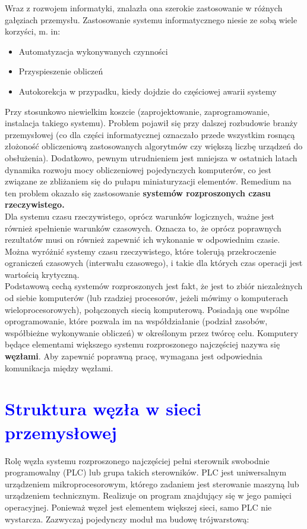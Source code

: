 \documentclass[a4paper,twoside]{article}
\begin{document}
Wraz z rozwojem informatyki, znalazła ona szerokie zastosowanie w różnych gałęziach przemysłu.  Zastosowanie systemu informatycznego niesie ze sobą wiele korzyści, m. in: \\
\begin{itemize}
	\item Automatyzacja wykonywanych czynności \\
	\item Przyspieszenie obliczeń \\
	\item Autokorekcja w przypadku, kiedy dojdzie do częściowej awarii systemy \\
\end{itemize}

Przy stosunkowo niewielkim koszcie (zaprojektowanie, zaprogramowanie, instalacja takiego systemu).  Problem pojawił się przy dalszej rozbudowie branży przemysłowej (co dla części informatycznej oznaczało przede wszystkim rosnącą złożoność obliczeniową zastosowanych algorytmów czy większą liczbę urządzeń do obsłużenia). Dodatkowo, pewnym utrudnieniem jest mniejsza w ostatnich latach dynamika rozwoju mocy obliczeniowej pojedynczych komputerów, co jest związane ze zbliżaniem się do pułapu miniaturyzacji elementów. Remedium na ten problem okazało się zastosowanie \textbf{systemów rozproszonych czasu rzeczywistego.} \\

Dla systemu czasu rzeczywistego, oprócz warunków logicznych, ważne jest również spełnienie warunków czasowych. Oznacza to, że oprócz poprawnych rezultatów musi on również zapewnić ich wykonanie w odpowiednim czasie. Można wyróżnić systemy czasu rzeczywistego, które tolerują przekroczenie ograniczeń czasowych (interwału czasowego), i takie dla których czas operacji jest wartością krytyczną. \\

Podstawową cechą systemów rozproszonych jest fakt, że jest to zbiór niezależnych od siebie komputerów (lub rzadziej procesorów, jeżeli mówimy o komputerach wieloprocesorowych), połączonych siecią komputerową. Posiadają one wspólne oprogramowanie, które pozwala im na współdziałanie (podział zasobów, współbieżne wykonywanie obliczeń) w określonym przez twórcę celu. Komputery będące elementami większego systemu rozproszonego najczęściej nazywa się \textbf{węzłami}. Aby zapewnić poprawną pracę, wymagana jest odpowiednia komunikacja między węzłami.

\section{\textcolor{blue}{Struktura węzła w sieci przemysłowej}}
Rolę węzła systemu rozproszonego najczęściej pełni sterownik swobodnie programowalny (PLC) lub grupa takich sterowników.  PLC jest uniwersalnym urządzeniem mikroprocesorowym, którego zadaniem jest sterowanie maszyną lub urządzeniem technicznym. Realizuje on program znajdujący się w jego pamięci operacyjnej. Ponieważ węzeł jest elementem większej sieci, samo PLC nie wystarcza. Zazwyczaj pojedynczy moduł ma budowę trójwarstową: \\
\end{document}
